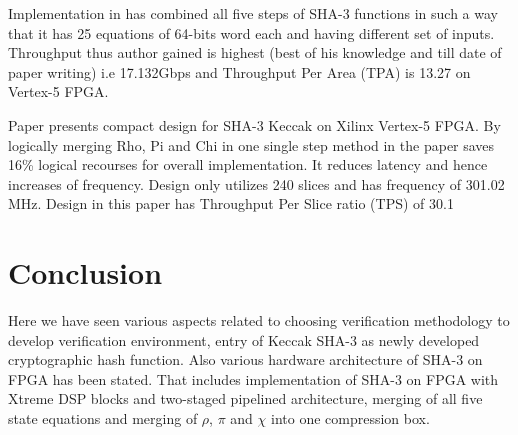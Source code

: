 Implementation in \cite{effv5} has combined all five steps of SHA-3 functions in such a way that it has 25 equations of 64-bits word each and having different set of inputs. Throughput thus author gained is highest (best of his knowledge and till date of paper writing) i.e 17.132Gbps and Throughput Per Area (TPA) is 13.27 on Vertex-5 FPGA. \par

Paper \cite{comimp} presents compact design for SHA-3 Keccak on Xilinx Vertex-5 FPGA. By logically merging Rho, Pi and Chi in one single step method in the paper saves 16\% logical recourses for overall implementation. It reduces latency and hence increases of frequency. Design only utilizes 240 slices and has frequency of 301.02 MHz. Design in this paper has Throughput Per Slice ratio (TPS) of 30.1

\section{Conclusion}

Here we have seen various aspects related to choosing verification methodology to develop verification environment, entry of Keccak SHA-3 as newly developed cryptographic hash function. Also various hardware architecture of SHA-3 on FPGA has been stated. That includes implementation of SHA-3 on FPGA with Xtreme DSP blocks and two-staged pipelined architecture, merging of all five state equations and merging of $\rho$, $\pi$ and $\chi$ into one compression box.